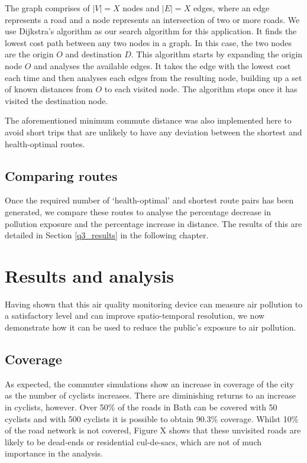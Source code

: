 \documentclass[11pt]{report}
\begin{document}
The graph comprises of $|V| = X$ nodes and $|E| = X$ edges, where an edge represents a road and a node represents an intersection of two or more roads. We use Dijkstra's algorithm \citep{dijkstra1959} as our search algorithm for this application. It finds the lowest cost path between any two nodes in a graph. In this case, the two nodes are the origin $O$ and destination $D$. This algorithm starts by expanding the origin node $O$ and analyses the available edges. It takes the edge with the lowest cost each time and then analyses each edges from the resulting node, building up a set of known distances from $O$ to each visited node. The algorithm stops once it has visited the destination node.

The aforementioned minimum commute distance was also implemented here to avoid short trips that are unlikely to have any deviation between the shortest and health-optimal routes.


\subsection{Comparing routes}

Once the required number of `health-optimal' and shortest route pairs has been generated, we compare these routes to analyse the percentage decrease in pollution exposure and the percentage increase in distance. The results of this are detailed in Section \ref{q3_results} in the following chapter.


\section{Results and analysis} \label{results:q3}

Having shown that this air quality monitoring device can measure air pollution to a satisfactory level and can improve spatio-temporal resolution, we now demonstrate how it can be used to reduce the public's exposure to air pollution.

\subsection{Coverage}

As expected, the commuter simulations show an increase in coverage of the city as the number of cyclists increases. There are diminishing returns to an increase in cyclists, however. Over 50\% of the roads in Bath can be covered with 50 cyclists and with 500 cyclists it is possible to obtain 90.3\% coverage. Whilst 10\% of the road network is not covered, Figure X shows that these unvisited roads are likely to be dead-ends or residential cul-de-sacs, which are not of much importance in the analysis.
\end{document}
